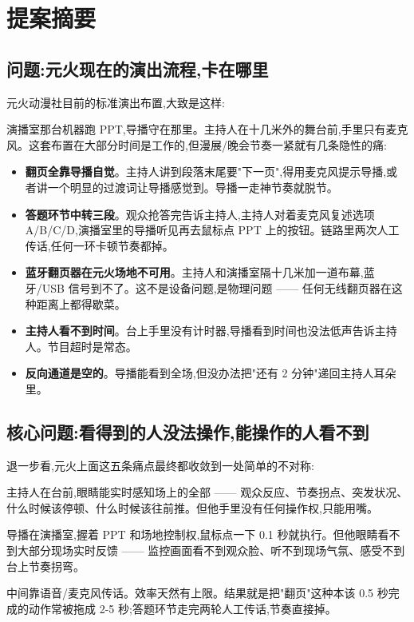 \section*{提案摘要}

\subsection*{问题:元火现在的演出流程,卡在哪里}

元火动漫社目前的标准演出布置,大致是这样:

演播室那台机器跑 PPT,导播守在那里。主持人在十几米外的舞台前,手里只有麦克风。这套布置在大部分时间是工作的,但漫展/晚会节奏一紧就有几条隐性的痛:

\begin{itemize}
  \item \textbf{翻页全靠导播自觉}。主持人讲到段落末尾要"下一页",得用麦克风提示导播,或者讲一个明显的过渡词让导播感觉到。导播一走神节奏就脱节。
  \item \textbf{答题环节中转三段}。观众抢答完告诉主持人,主持人对着麦克风复述选项 A/B/C/D,演播室里的导播听见再去鼠标点 PPT 上的按钮。链路里两次人工传话,任何一环卡顿节奏都掉。
  \item \textbf{蓝牙翻页器在元火场地不可用}。主持人和演播室隔十几米加一道布幕,蓝牙/USB 信号到不了。这不是设备问题,是物理问题 —— 任何无线翻页器在这种距离上都得歇菜。
  \item \textbf{主持人看不到时间}。台上手里没有计时器,导播看到时间也没法低声告诉主持人。节目超时是常态。
  \item \textbf{反向通道是空的}。导播能看到全场,但没办法把"还有 2 分钟"递回主持人耳朵里。
\end{itemize}

\subsection*{核心问题:看得到的人没法操作,能操作的人看不到}

退一步看,元火上面这五条痛点最终都收敛到一处简单的不对称:

主持人在台前,眼睛能实时感知场上的全部 —— 观众反应、节奏拐点、突发状况、什么时候该停顿、什么时候该往前推。但他手里没有任何操作权,只能用嘴。

导播在演播室,握着 PPT 和场地控制权,鼠标点一下 0.1 秒就执行。但他眼睛看不到大部分现场实时反馈 —— 监控画面看不到观众脸、听不到现场气氛、感受不到台上节奏拐弯。

中间靠语音/麦克风传话。效率天然有上限。结果就是把"翻页"这种本该 0.5 秒完成的动作常被拖成 2-5 秒;答题环节走完两轮人工传话,节奏直接掉。

